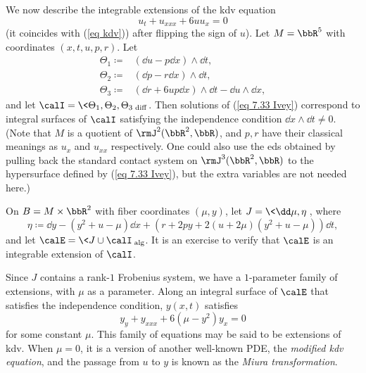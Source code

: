 \begin{example}\label{ex 7.5.6 Ivey}
    We now describe the integrable extensions of the \gls{kdv} equation 
    \[u_t+u_{xxx}+6uu_x=0\label{eq 7.33 Ivey}\]
    (it coincides with (\ref{eq kdv})) after flipping the sign of $u$). Let $M=\bbR^5$ with coordinates $(x,t,u,p,r)$. Let 
    \begin{align}
        \Theta_1\coloneqq &(\dd u-p\dd x)\wedge\dd t,\\
        \Theta_2\coloneqq &(\dd p-r\dd x)\wedge\dd t,\\
        \Theta_3\coloneqq &(\dd r+6u p\dd x)\wedge \dd t-\dd u\wedge\dd x,
    \end{align}
    and let $\calI=\<\Theta_1,\Theta_2,\Theta_3\>_{\mathrm{diff}}$. Then solutions of (\ref{eq 7.33 Ivey}) correspond to integral surfaces of $\calI$ satisfying the independence condition $\dd x\wedge\dd t\neq 0$. (Note that $M$ is a quotient of $\rmJ^2(\bbR^2,\bbR)$, and $p,r$ have their classical meanings as $u_x$ and $u_{xx}$ respectively. One could also use the \gls{eds} obtained by pulling back the standard contact system on $\rmJ^3(\bbR^2,\bbR)$ to the hypersurface defined by (\ref{eq 7.33 Ivey}), but the extra variables are not needed here.)

    On $B=M\times\bbR^2$ with fiber coordinates $(\mu,y)$, let $J=\<\dd \mu,\eta\>$, where 
    \[\eta\coloneqq \dd y-(y^2+u-\mu)\dd x+(r+2py+2(u+2\mu)(y^2+u-\mu))\dd t,\]
    and let $\calE=\<J\cup \calI\>_{\mathrm{alg}}$. It is an exercise to verify that $\calE$ is an integrable extension of $\calI$.

    Since $J$ contains a rank-$1$ Frobenius system, we have a $1$-parameter family of extensions, with $\mu$ as a parameter. Along an integral surface of $\calE$ that satisfies the independence condition, $y(x,t)$ satisfies 
    \[y_y+y_{xxx}+6(\mu-y^2)y_x=0\label{eq 7.34 Ivey}\]
    for some constant $\mu$. This family of equations may be said to be extensions of \gls{kdv}. When $\mu=0$, it is a version of another well-known PDE, the \emph{modified \gls{kdv} equation}, and the passage from $u$ to $y$ is known as the \emph{Miura transformation}.
\end{example}


